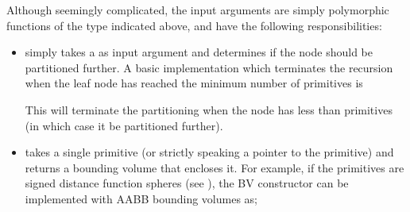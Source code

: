 \documentclass[letterpaper,10pt,english]{sphinxmanual}
\begin{document}
\sphinxAtStartPar
Although seemingly complicated, the input arguments are simply polymorphic functions of the type indicated above, and have the following responsibilities:
\begin{itemize}
\item {} 
\sphinxAtStartPar
{} simply takes a  as input argument and determines if the node should be partitioned further.
A basic implementation which terminates the recursion when the leaf node has reached the minimum number of primitives is

\begin{sphinxVerbatim}[commandchars=\\\{\}]
      \PYG{p}{[}\PYG{p}{]}        
      
\end{sphinxVerbatim}

\sphinxAtStartPar
This will terminate the partitioning when the node has less than  primitives (in which case it  be partitioned further).

\item {} 
\sphinxAtStartPar
{} takes a single primitive (or strictly speaking a pointer to the primitive) and returns a bounding volume that encloses it.
For example, if the primitives  are signed distance function spheres (see {\hyperref[\detokenize{ImplemSDF:chap-analyticsdf}]{}}), the BV constructor can be implemented
with AABB bounding volumes as;

\begin{sphinxVerbatim}[commandchars=\\\{\}]
        
     
     
   


\end{sphinxVerbatim}
\end{itemize}
\end{document}
